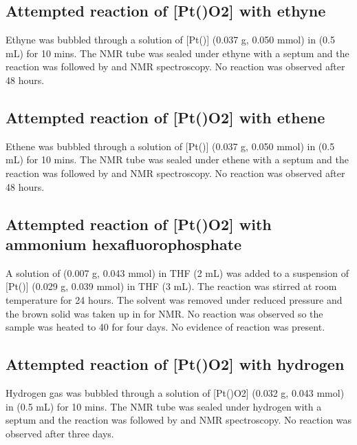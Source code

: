 \subsection*{Attempted reaction of [Pt(\tButhixantphos)O2] with ethyne}

Ethyne was bubbled through a solution of [Pt(\tButhixantphos)] (0.037 g, 0.050 mmol) in  (0.5 mL) for 10 mins.  The NMR tube was sealed under ethyne with a septum and the reaction was followed by \proton{} and \phosphorus{} NMR spectroscopy.  No reaction was observed after 48 hours.

\subsection*{Attempted reaction of [Pt(\tButhixantphos)O2] with ethene}

Ethene was bubbled through a solution of [Pt(\tButhixantphos)] (0.037 g, 0.050 mmol) in  (0.5 mL) for 10 mins.  The NMR tube was sealed under ethene with a septum and the reaction was followed by \proton{} and \phosphorus{} NMR spectroscopy.  No reaction was observed after 48 hours.

\subsection*{Attempted reaction of [Pt(\tButhixantphos)O2] with ammonium hexafluorophosphate}

A solution of  (0.007 g, 0.043 mmol) in THF (2 mL) was added to a suspension of  [Pt(\tButhixantphos)] (0.029 g, 0.039 mmol) in THF (3 mL).  The reaction was stirred at room temperature for 24 hours.  The solvent was removed under reduced pressure and the brown solid was taken up in  for NMR.  No reaction was observed so the sample was heated to 40 \degC{} for four days.  No evidence of reaction was present.  

\subsection*{Attempted reaction of [Pt(\tButhixantphos)O2] with hydrogen}

Hydrogen gas was bubbled through a solution of [Pt(\tButhixantphos)O2] (0.032 g, 0.043 mmol) in  (0.5 mL) for 10 mins.  The NMR tube was sealed under hydrogen with a septum and the reaction was followed by \proton{} and \phosphorus{} NMR spectroscopy.  No reaction was observed after three days.  

